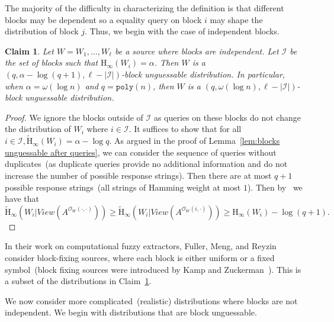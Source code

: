 \documentclass[11pt]{article}
\newcommand{\lemref}[1]{\mbox{Lemma~\ref{#1}}}
\newcommand{\clref}[1]{\mbox{Claim~\ref{#1}}}
\newcommand{\poly}{\ensuremath{\mathtt{poly}}\xspace}
\newcommand{\Hoo}{\mathrm{H}_\infty}
\newcommand{\Hav}{\tilde{\mathrm{H}}_\infty}
\newtheorem{claim}[theorem]{Claim}
\begin{document}
The majority of the difficulty in characterizing the definition is that different blocks may be dependent so a equality query on block $i$ may shape the distribution of block $j$.  Thus, we begin with the case of independent blocks.

\begin{claim}
\label{cl:independent high ent}
Let $W = W_1,..., W_\ell$ be a source where blocks are independent.  Let $\mathcal{I}$ be the set of blocks such that $\Hoo(W_i ) =\alpha $.  Then $W$ is a $(q, \alpha - \log (q+1), \ell - |\mathcal{I}|)$-block unguessable distribution.  In particular, when $\alpha = \omega(\log n)$ and $q = \poly(n)$, then $W$ is a $(q, \omega(\log n), \ell - |\mathcal{I}|)$-block unguessable distribution.
\end{claim}
\begin{proof}
We ignore the blocks outside of $\mathcal{I}$ as queries on these blocks do not change the distribution of $W_i$ where $i\in \mathcal{I}$.  It suffices to show that for all $i\in \mathcal{I}, \Hav(W_i) = \alpha -\log q$.  As argued in the proof of \lemref{lem:blocks unguessable after queries}, we can consider the sequence of queries without duplicates~(as duplicate queries provide no additional information and do not increase the number of possible response strings).  Then there are at most $q+1$ possible response strings~(all strings of Hamming weight at most $1$).  Then by~\cite[Lemma 2.2]{DBLP:journals/siamcomp/DodisORS08} we have that 
\[
\Hav(W_i | View(A^{\mathcal{O}_{W}(\cdot, \cdot)})) \geq \Hav(W_i | View(A^{\mathcal{O}_{W}(i, \cdot)})) \geq \Hoo(W_i) -\log (q+1).
\]
\end{proof}
In their work on computational fuzzy extractors, Fuller, Meng, and Reyzin~\cite{fuller2013computational} consider block-fixing sources, where each block is either uniform or a fixed symbol~(block fixing sources were introduced by Kamp and Zuckerman~\cite{KZ07}).  This is a subset of the distributions in \clref{cl:independent high ent}.  

We now consider more complicated~(realistic) distributions where blocks are not independent.  We begin with distributions that are block unguessable.
\end{document}
